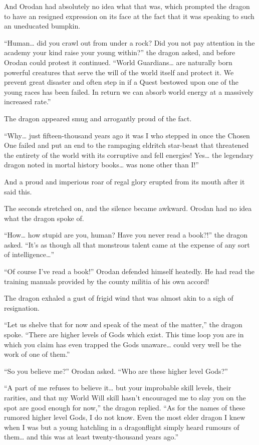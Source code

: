 \documentclass[a4paper,10pt]{book}
\begin{document}
And Orodan had absolutely no idea what that was, which prompted the dragon to have an resigned expression on its face at the fact that it was speaking to such an uneducated bumpkin.\par
“Human… did you crawl out from under a rock? Did you not pay attention in the academy your kind raise your young within?” the dragon asked, and before Orodan could protest it continued. “World Guardians… are naturally born powerful creatures that serve the will of the world itself and protect it. We prevent great disaster and often step in if a Quest bestowed upon one of the young races has been failed. In return we can absorb world energy at a massively increased rate.”\par
The dragon appeared smug and arrogantly proud of the fact.\par
“Why… just fifteen-thousand years ago it was I who stepped in once the Chosen One failed and put an end to the rampaging eldritch star-beast that threatened the entirety of the world with its corruptive and fell energies! Yes… the legendary dragon noted in mortal history books… was none other than I!”\par
And a proud and imperious roar of regal glory erupted from its mouth after it said this.\par
The seconds stretched on, and the silence became awkward. Orodan had no idea what the dragon spoke of.\par
“How… how stupid are you, human? Have you never read a book?!” the dragon asked. “It’s as though all that monstrous talent came at the expense of any sort of intelligence…”\par
“Of course I’ve read a book!” Orodan defended himself heatedly. He had read the training manuals provided by the county militia of his own accord!\par
The dragon exhaled a gust of frigid wind that was almost akin to a sigh of resignation.\par
“Let us shelve that for now and speak of the meat of the matter,” the dragon spoke. “There are higher levels of Gods which exist. This time loop you are in which you claim has even trapped the Gods unaware… could very well be the work of one of them.”\par
“So you believe me?” Orodan asked. “Who are these higher level Gods?”\par
“A part of me refuses to believe it… but your improbable skill levels, their rarities, and that my World Will skill hasn’t encouraged me to slay you on the spot are good enough for now,” the dragon replied. “As for the names of these rumored higher level Gods, I do not know. Even the most elder dragon I knew when I was but a young hatchling in a dragonflight simply heard rumours of them… and this was at least twenty-thousand years ago.”\par
\end{document}
